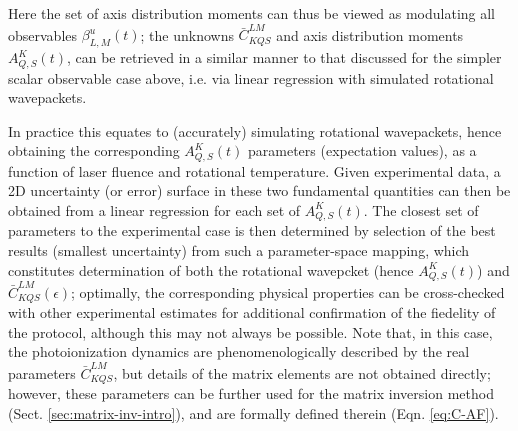 
Here the set of axis distribution moments can thus be viewed as modulating all observables $\beta_{L,M}^{u}(t)$; the unknowns $\bar{C}_{KQS}^{LM}$ and axis distribution moments $A_{Q,S}^{K}(t)$, can be retrieved in a similar manner to that discussed for the simpler scalar observable case above, i.e. via linear regression with simulated rotational wavepackets. 

In practice this equates to (accurately) simulating rotational wavepackets, hence obtaining the corresponding $A_{Q,S}^{K}(t)$ parameters (expectation values), as a function of laser fluence and rotational temperature. Given experimental data, a 2D uncertainty (or error) surface in these two fundamental quantities can then be obtained from a linear regression for each set of $A_{Q,S}^{K}(t)$. The closest set of parameters to the experimental case is then determined by selection of the best results (smallest uncertainty) from such a parameter-space mapping, which constitutes determination of both the rotational wavepcket (hence $A_{Q,S}^{K}(t)$) and $\bar{C}_{KQS}^{LM}(\epsilon)$; optimally, the corresponding physical properties can be cross-checked with other experimental estimates for additional confirmation of the fiedelity of the protocol, although this may not always be possible. Note that, in this case, the photoionization dynamics are phenomenologically described by the real parameters $\bar{C}_{KQS}^{LM}$, but details of the matrix elements are not obtained directly; however, these parameters can be further used for the matrix inversion method (Sect. \ref{sec:matrix-inv-intro}), and are formally defined therein (Eqn. \ref{eq:C-AF}).






